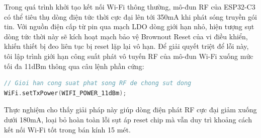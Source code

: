 Trong quá trình khởi tạo kết nối Wi-Fi thông thường, mô-đun RF của ESP32-C3 có thể tiêu thụ dòng điện tức thời cực đại lên tới 350mA khi phát sóng truyền gói tin. Với nguồn điện cấp từ pin qua mạch LDO dòng giới hạn nhỏ, hiện tượng sụt dòng tức thời này sẽ kích hoạt mạch bảo vệ Brownout Reset của vi điều khiển, khiến thiết bị đeo liên tục bị reset lặp lại vô hạn. Để giải quyết triệt để lỗi này, tôi lập trình giới hạn công suất phát vô tuyến RF của mô-đun Wi-Fi xuống mức tối đa 11dBm thông qua câu lệnh phần cứng:
\begin{lstlisting}[language=C++]
// Gioi han cong suat phat song RF de chong sut dong
WiFi.setTxPower(WIFI_POWER_11dBm);
\end{lstlisting}
Thực nghiệm cho thấy giải pháp này giúp dòng điện phát RF cực đại giảm xuống dưới 180mA, loại bỏ hoàn toàn lỗi sụt áp reset chip mà vẫn duy trì khoảng cách kết nối Wi-Fi tốt trong bán kính 15 mét.
